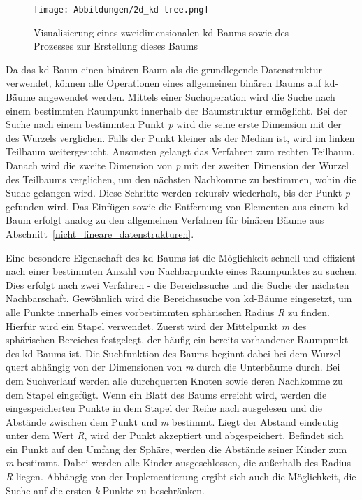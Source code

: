 
\begin{figure}[!b]
	\texttt{[image: Abbildungen/2d\_kd-tree.png]}
	\centering
	\caption{Visualisierung eines zweidimensionalen kd-Baums sowie des Prozesses zur Erstellung dieses Baums \autocite[60]{garcia-garcia_alberto_towards_2015}}
	\label{fig: kd-tree_creation}
\end{figure}

Da das kd-Baum einen binären Baum als die grundlegende Datenstruktur verwendet, können alle Operationen eines allgemeinen binären Baums auf kd-Bäume angewendet werden. Mittels einer Suchoperation wird die Suche nach einem bestimmten Raumpunkt innerhalb der Baumstruktur ermöglicht. Bei der Suche nach einem bestimmten Punkt \textit{p} wird die seine erste Dimension mit der des Wurzels verglichen. Falls der Punkt kleiner als der Median ist, wird im linken Teilbaum weitergesucht. Ansonsten gelangt das Verfahren zum rechten Teilbaum. Danach wird die zweite Dimension von \textit{p} mit der zweiten Dimension der Wurzel des Teilbaums verglichen, um den nächsten Nachkomme zu bestimmen, wohin die Suche gelangen wird. Diese Schritte werden rekursiv wiederholt, bis der Punkt \textit{p} gefunden wird. Das Einfügen sowie die Entfernung von Elementen aus einem kd-Baum erfolgt analog zu den allgemeinen Verfahren für binären Bäume aus Abschnitt~\ref{nicht_lineare_datenstrukturen}. \autocite[94]{saha_advanced_2019}

Eine besondere Eigenschaft des kd-Baums ist die Möglichkeit schnell und effizient nach einer bestimmten Anzahl von Nachbarpunkte eines Raumpunktes zu suchen. Dies erfolgt nach zwei Verfahren - die Bereichssuche und die Suche der nächsten Nachbarschaft. Gewöhnlich wird die Bereichssuche von kd-Bäume eingesetzt, um alle Punkte innerhalb eines vorbestimmten sphärischen Radius \textit{R} zu finden. Hierfür wird ein Stapel verwendet. Zuerst wird der Mittelpunkt \textit{m} des sphärischen Bereiches festgelegt, der häufig ein bereits vorhandener Raumpunkt des kd-Baums ist. Die Suchfunktion des Baums beginnt dabei bei dem Wurzel quert abhängig von der Dimensionen von \textit{m} durch die Unterbäume durch. Bei dem Suchverlauf werden alle durchquerten Knoten sowie deren Nachkomme zu dem Stapel eingefügt. Wenn ein Blatt des Baums erreicht wird, werden die eingespeicherten Punkte in dem Stapel der Reihe nach ausgelesen und die Abstände zwischen dem Punkt und \textit{m} bestimmt. Liegt der Abstand eindeutig unter dem Wert \textit{R}, wird der Punkt akzeptiert und abgespeichert. Befindet sich ein Punkt auf den Umfang der Sphäre, werden die Abstände seiner Kinder zum \textit{m} bestimmt. Dabei werden alle Kinder ausgeschlossen, die außerhalb des Radius \textit{R} liegen. Abhängig von der Implementierung ergibt sich auch die Möglichkeit, die Suche auf die ersten \textit{k} Punkte zu beschränken. \autocite[95]{saha_advanced_2019}

